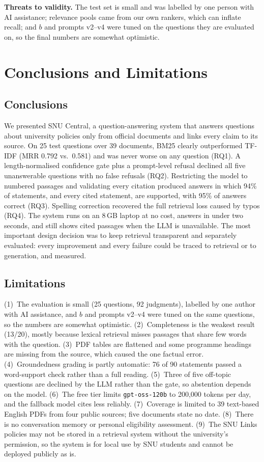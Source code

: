\documentclass[conference]{IEEEtran}
\newcommand{\code}[1]{\texttt{#1}}
\begin{document}
\textbf{Threats to validity.} The test set is small and was labelled by one person with AI assistance; relevance pools came from our own rankers, which can inflate recall; and $b$ and prompts v2--v4 were tuned on the questions they are evaluated on, so the final numbers are somewhat optimistic.

\section{Conclusions and Limitations}\label{sec:conclusion}

\subsection{Conclusions}
We presented SNU Central, a question-answering system that answers questions about university policies only from official documents and links every claim to its source. On 25 test questions over 39 documents, BM25 clearly outperformed TF-IDF (MRR 0.792 vs.\ 0.581) and was never worse on any question (RQ1). A length-normalised confidence gate plus a prompt-level refusal declined all five unanswerable questions with no false refusals (RQ2). Restricting the model to numbered passages and validating every citation produced answers in which 94\% of statements, and every cited statement, are supported, with 95\% of answers correct (RQ3). Spelling correction recovered the full retrieval loss caused by typos (RQ4). The system runs on an 8\,GB laptop at no cost, answers in under two seconds, and still shows cited passages when the LLM is unavailable. The most important design decision was to keep retrieval transparent and separately evaluated: every improvement and every failure could be traced to retrieval or to generation, and measured.

\subsection{Limitations}
(1)~The evaluation is small (25 questions, 92 judgments), labelled by one author with AI assistance, and $b$ and prompts v2--v4 were tuned on the same questions, so the numbers are somewhat optimistic. (2)~Completeness is the weakest result (13/20), mostly because lexical retrieval misses passages that share few words with the question. (3)~PDF tables are flattened and some programme headings are missing from the source, which caused the one factual error. (4)~Groundedness grading is partly automatic: 76 of 90 statements passed a word-support check rather than a full reading. (5)~Three of five off-topic questions are declined by the LLM rather than the gate, so abstention depends on the model. (6)~The free tier limits \code{gpt-oss-120b} to 200{,}000 tokens per day, and the fallback model cites less reliably. (7)~Coverage is limited to 39 text-based English PDFs from four public sources; five documents state no date. (8)~There is no conversation memory or personal eligibility assessment. (9)~The SNU Links policies may not be stored in a retrieval system without the university's permission, so the system is for local use by SNU students and cannot be deployed publicly as is.
\end{document}

